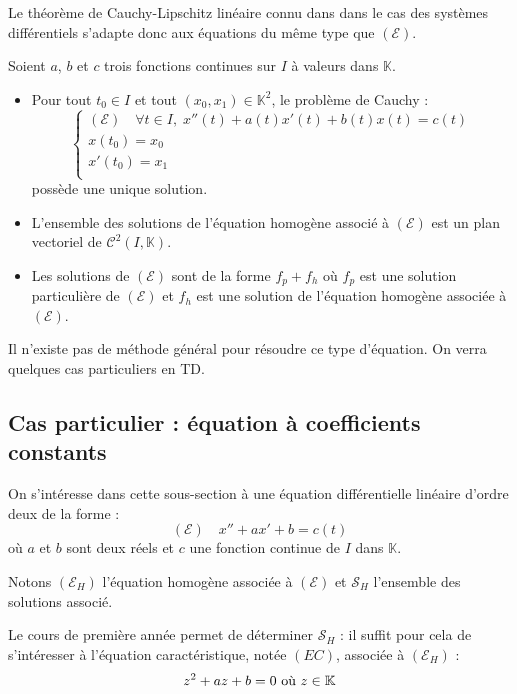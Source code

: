 \documentclass[a4paper,10pt]{report}
\begin{document}
Le théorème de Cauchy-Lipschitz linéaire connu dans dans le cas des systèmes différentiels s'adapte donc aux équations du même type que $(\mathcal{E})$.

\begin{Theoreme}{} Soient $a$, $b$ et $c$ trois fonctions continues sur $I$ à valeurs dans $\mathbb{K}$.

\begin{itemize}
\item Pour tout $t_0 \in I$ et tout $(x_0,x_1) \in \mathbb{K}^2$, le problème de Cauchy :
$$ \left\lbrace \begin{array}{l}
(\mathcal{E}) \quad \forall t \in I, \; x''(t)+a(t)x'(t)+b(t)x(t) = c(t)  \\
x(t_0)=x_0 \\
x'(t_0) = x_1 \\
\end{array}\right.$$
possède une unique solution.
\item L'ensemble des solutions de l'équation homogène associé à $(\mathcal{E})$ est un plan vectoriel de $\mathcal{C}^2(I, \mathbb{K})$.
\item Les solutions de $(\mathcal{E})$ sont de la forme $f_p + f_h$ où $f_p$ est une solution particulière de $(\mathcal{E})$ et $f_h$ est une solution de l'équation homogène associée à $(\mathcal{E})$.
\end{itemize}
\end{Theoreme}

\begin{Remarque}{} Il n'existe pas de méthode général pour résoudre ce type d'équation. On verra quelques cas particuliers en TD.
\end{Remarque}

\subsection{Cas particulier : équation à coefficients constants}

On s'intéresse dans cette sous-section à une équation différentielle linéaire d'ordre deux de la forme :
$$ (\mathcal{E}) \quad x''+ax'+b=c(t)$$
où $a$ et $b$ sont deux réels et $c$ une fonction continue de $I$ dans $\mathbb{K}$.

\medskip

Notons $(\mathcal{E}_H)$ l'équation homogène associée à $(\mathcal{E})$ et $\mathcal{S}_H$ l'ensemble des solutions associé.

\medskip

Le cours de première année permet de déterminer $\mathcal{S}_H$ : il suffit pour cela de s'intéresser à l'équation caractéristique, notée $(EC)$, associée à $(\mathcal{E}_H)$ :
$$ z^2+az+b=0 \hbox{ où } z \in \mathbb{K}$$
\end{document}
